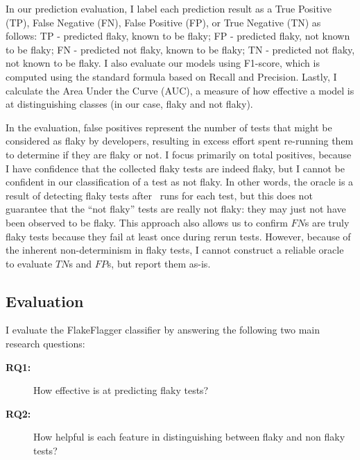 


In our prediction evaluation, I label each prediction result as a True Positive (TP), False Negative (FN), False Positive (FP), or True Negative (TN) as follows:
TP - predicted flaky, known to be flaky; FP - predicted flaky, not known to be flaky; FN - predicted not flaky, known to be flaky; TN - predicted not flaky, not known to be flaky.
I also evaluate our models using F1-score, which is computed using the standard formula based on Recall and Precision. %
Lastly, I calculate the Area Under the Curve (AUC), a measure of how effective a model is at distinguishing classes (in our case, flaky and not flaky).

In the evaluation, false positives represent the number of tests that might be considered as flaky by developers, resulting in excess effort spent re-running them to determine if they are flaky or not. I focus primarily on total positives, because I have confidence that the collected flaky tests are indeed flaky, but I cannot be confident in our classification of a test as not flaky. 
In other words, the oracle is a result of detecting flaky tests after \numruns~runs for each test, but this does not guarantee that the ``not flaky'' tests are really not flaky: they may just not have been observed to be flaky. 
This approach also allows us to confirm $FN$s are truly flaky tests because they fail at least once during rerun tests.
However, because of the inherent non-determinism in flaky tests, I cannot construct a reliable oracle to evaluate $TN$s and $FP$s, but report them as-is.






\subsection{Evaluation}
I evaluate the FlakeFlagger classifier by answering the following two main research questions:


\begin{description}
  \item[\textbf{RQ1:}] How effective is \sysName at predicting flaky tests?
  \item[\textbf{RQ2:}] How helpful is each feature in distinguishing between flaky and non flaky tests?

 \end{description}

